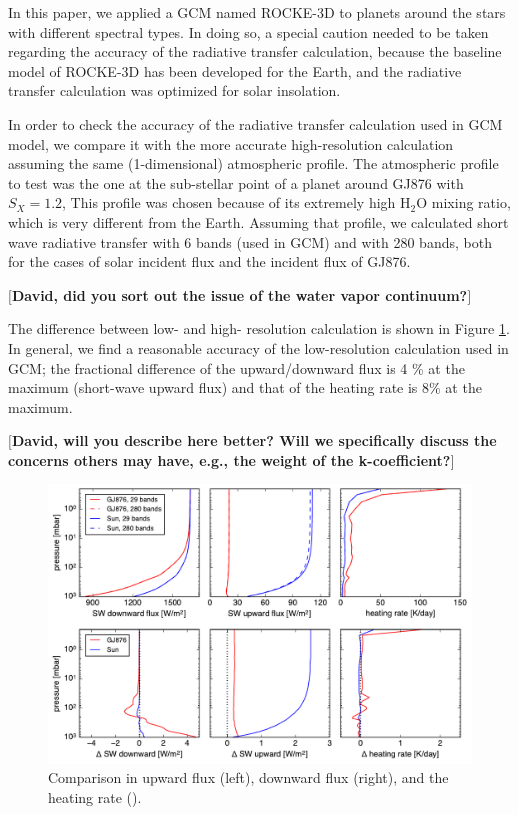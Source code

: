\documentclass[11pt,numberedappendix,twocolappendix,]{emulateapj}
\def\water{H$_2$O }
\def\memo#1{\color{red}$[${\bf #1}$]$ \color{black}}
\begin{document}
In this paper, we applied a GCM named ROCKE-3D to planets around the stars with different spectral types. 
In doing so, a special caution needed to be taken regarding the accuracy of the radiative transfer calculation, because the baseline model of ROCKE-3D has been developed for the Earth, and the radiative transfer calculation was optimized for solar insolation. 

In order to check the accuracy of the radiative transfer calculation used in GCM model, we compare it with the more accurate high-resolution calculation assuming the same (1-dimensional) atmospheric profile. 
The atmospheric profile to test was the one at the sub-stellar point of a planet around GJ876 with $S_X=1.2$, 
This profile was chosen because of its extremely high \water mixing ratio, which is very different from the Earth. 
Assuming that profile, we calculated short wave radiative transfer with 6 bands (used in GCM) and with 280 bands, both for the cases of solar incident flux and the incident flux of GJ876. 

\memo{David, did you sort out the issue of the water vapor continuum?}

The difference between low- and high- resolution calculation is shown in Figure \ref{fig:socrates}. 
In general, we find a reasonable accuracy of the low-resolution calculation used in GCM; the fractional difference of the upward/downward flux is 4 \% at the maximum (short-wave upward flux) and that of the heating rate is 8\% at the maximum. 

\memo{David, will you describe here better? Will we specifically discuss the concerns others may have, e.g., the weight of the k-coefficient?}

\begin{figure}[!htb]
    \begin{center}
    \includegraphics[width=0.8\hsize]{fig/rad_comparison_SW29-SW280_AqOH0TLS_GJ876S12P20L40Q.pdf}
    \end{center}
\caption{Comparison in upward flux (left), downward flux (right), and the heating rate (). }                                                                                                             
\label{fig:socrates}
\end{figure}
\end{document}
